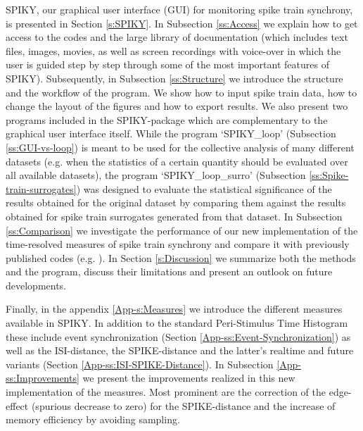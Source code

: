 \documentclass[10pt,twocolumn]{elsart5p}
\begin{document}
SPIKY, our graphical user interface (GUI) for monitoring spike train synchrony, is presented in Section \ref{s:SPIKY}. In Subsection \ref{ss:Access} we explain how to get access to the codes and the large library of documentation (which includes text files, images, movies, as well as screen recordings with voice-over in which the user is guided step by step through some of the most important features of SPIKY). Subsequently, in Subsection \ref{ss:Structure} we introduce the structure and the workflow of the program. We show how to input spike train data, how to change the layout of the figures and how to export results. We also present two programs included in the SPIKY-package which are complementary to the graphical user interface itself. While the program `SPIKY\_loop' (Subsection \ref{ss:GUI-vs-loop}) is meant to be used for the collective analysis of many different datasets (e.g. when the statistics of a certain quantity should be evaluated over all available datasets), the program `SPIKY\_loop\_surro' (Subsection \ref{ss:Spike-train-surrogates}) was designed to evaluate the statistical significance of the results obtained for the original dataset by comparing them against the results obtained for spike train surrogates generated from that dataset. In Subsection \ref{ss:Comparison} we investigate the performance of our new implementation of the time-resolved measures of spike train synchrony and compare it with previously published codes (e.g. \citet{Rusu14}). In Section \ref{s:Discussion} we summarize both the methods and the program, discuss their limitations and present an outlook on future developments.

Finally, in the appendix \ref{App-s:Measures} we introduce the different measures available in SPIKY. In addition to the standard Peri-Stimulus Time Histogram these include event synchronization (Section \ref{App-ss:Event-Synchronization}) as well as the ISI-distance, the SPIKE-distance and the latter's realtime and future variants (Section \ref{App-ss:ISI-SPIKE-Distance}). In Subsection \ref{App-ss:Improvements} we present the improvements realized in this new implementation of the measures. Most prominent are the correction of the edge-effect (spurious decrease to zero) for the SPIKE-distance and the increase of memory efficiency by avoiding sampling. 

%
%
%
%
	
\end{document}
